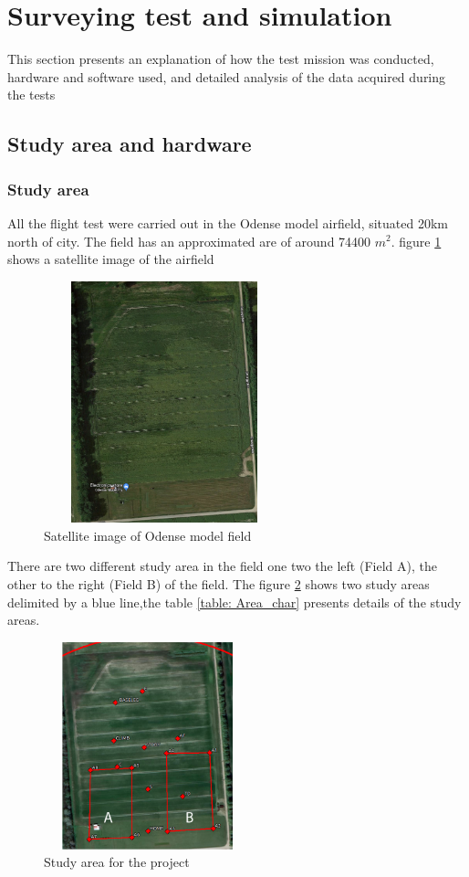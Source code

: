 \section{Surveying test and simulation}
This section presents an explanation of how the test mission was conducted, hardware and software used, and detailed analysis of the data acquired during the tests
\subsection{Study area and hardware}
\subsubsection{Study area}
All the flight test were carried out in the Odense model airfield, situated 20km north of city. The field has an approximated are of around 74400 $m^2$. figure \ref{fig:OdenseModel} shows a satellite image of the airfield
\begin{figure}[H]
\centering
\includegraphics[width=7cm,height=7cm,keepaspectratio]{imagenes/Satelite_view.png}
\caption{Satellite image of Odense model field}
\label{fig:OdenseModel}
\end{figure}
There are two different study area in the field one two the left (Field A), the other to the right (Field B) of the field. The figure \ref{fig:Study area} shows two study areas delimited by a blue line,the table \ref{table: Area_char} presents details of the study areas.
\begin{figure}[H]
\centering
\includegraphics[width=6cm,height=6cm,keepaspectratio]{imagenes/Study_Area.png}
\caption{Study area for the project}
\label{fig:Study area}
\end{figure}

